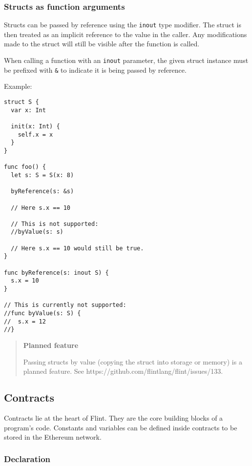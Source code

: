 \subsubsection{Structs as function arguments}
\label{sec:appendix-b-structs-as-function-arguments}

Structs can be passed by reference using the \texttt{inout} type modifier. The struct is then treated as an implicit reference to the value in the caller. Any modifications made to the struct will still be visible after the function is called.

When calling a function with an \texttt{inout} parameter, the given struct instance must be prefixed with \texttt{&} to indicate it is being passed by reference.

Example:

\begin{verbatim}
struct S {
  var x: Int

  init(x: Int) {
    self.x = x
  }
}

func foo() {
  let s: S = S(x: 8)

  byReference(s: &s)

  // Here s.x == 10

  // This is not supported:
  //byValue(s: s)

  // Here s.x == 10 would still be true.
}

func byReference(s: inout S) {
  s.x = 10
}

// This is currently not supported:
//func byValue(s: S) {
//  s.x = 12
//}
\end{verbatim}

\begin{quote}
\textbf{Planned feature}

Passing structs by value (copying the struct into storage or memory) is a planned feature. See https://github.com/flintlang/flint/issues/133.
\end{quote}

\subsection{Contracts}
\label{sec:appendix-b-contracts}

Contracts lie at the heart of Flint. They are the core building blocks of a program's code. Constants and variables can be defined inside contracts to be stored in the Ethereum network.

\subsubsection{Declaration}
\label{sec:appendix-b-declaration-1}

